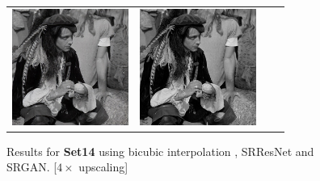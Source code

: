 \documentclass[10pt,twocolumn,letterpaper]{article}
\begin{document}
\begin{figure}[h!]
\begin{tabular}{cccc}
     	\includegraphics[width=1.5in]{images/used/appendix/jpg/Set14/man_SRGAN-VGG54} &
     	\includegraphics[width=1.5in]{images/used/appendix/jpg/Set14/man_HR} \\     	
  	\end{tabular}
  	\label{fig:app_Set14b}
  	\caption{Results for \textbf{Set14} using bicubic interpolation , SRResNet and SRGAN. [$4\times$ upscaling]} 
\end{figure}
\end{document}

